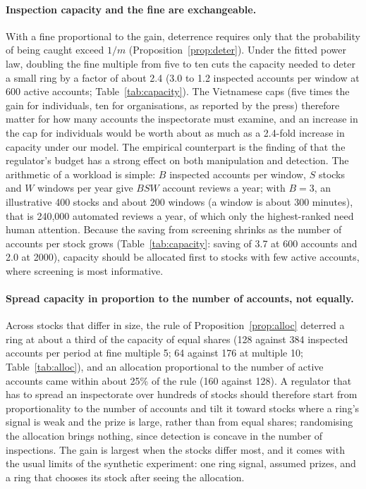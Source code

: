\paragraph{Inspection capacity and the fine are exchangeable.} With a fine proportional to the gain, deterrence requires only that the probability of being caught exceed $1/m$ (Proposition~\ref{prop:deter}). Under the fitted power law, doubling the fine multiple from five to ten cuts the capacity needed to deter a small ring by a factor of about 2.4 (3.0 to 1.2 inspected accounts per window at 600 active accounts; Table~\ref{tab:capacity}). The Vietnamese caps (five times the gain for individuals, ten for organisations, as reported by the press) therefore matter for how many accounts the inspectorate must examine, and an increase in the cap for individuals would be worth about as much as a 2.4-fold increase in capacity under our model. The empirical counterpart is the finding of \citet{comerton2014} that the regulator's budget has a strong effect on both manipulation and detection. The arithmetic of a workload is simple: $B$ inspected accounts per window, $S$ stocks and $W$ windows per year give $BSW$ account reviews a year; with $B=3$, an illustrative 400 stocks and about 200 windows (a window is about 300 minutes), that is 240,000 automated reviews a year, of which only the highest-ranked need human attention. Because the saving from screening shrinks as the number of accounts per stock grows (Table~\ref{tab:capacity}: saving of 3.7 at 600 accounts and 2.0 at 2000), capacity should be allocated first to stocks with few active accounts, where screening is most informative.

\paragraph{Spread capacity in proportion to the number of accounts, not equally.} Across stocks that differ in size, the rule of Proposition~\ref{prop:alloc} deterred a ring at about a third of the capacity of equal shares (128 against 384 inspected accounts per period at fine multiple 5; 64 against 176 at multiple 10; Table~\ref{tab:alloc}), and an allocation proportional to the number of active accounts came within about 25\% of the rule (160 against 128). A regulator that has to spread an inspectorate over hundreds of stocks should therefore start from proportionality to the number of accounts and tilt it toward stocks where a ring's signal is weak and the prize is large, rather than from equal shares; randomising the allocation brings nothing, since detection is concave in the number of inspections. The gain is largest when the stocks differ most, and it comes with the usual limits of the synthetic experiment: one ring signal, assumed prizes, and a ring that chooses its stock after seeing the allocation.

